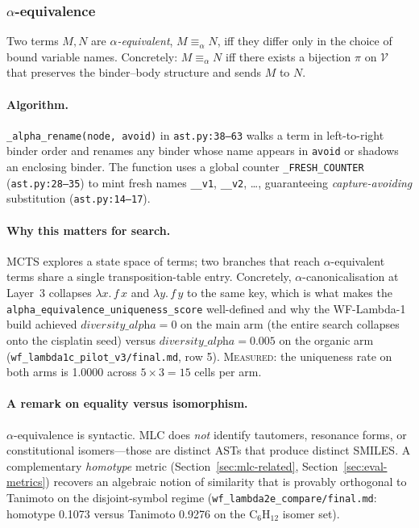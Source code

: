 \subsubsection{$\alpha$-equivalence}
\label{sec:mlc-alpha}

Two terms $M, N$ are \emph{$\alpha$-equivalent},
$M \equiv_{\alpha} N$, iff they differ only in the choice of bound
variable names. Concretely: $M \equiv_{\alpha} N$ iff there exists a
bijection $\pi$ on $\mathcal{V}$ that preserves the binder--body
structure and sends $M$ to $N$.

\paragraph{Algorithm.}
\texttt{\_alpha\_rename(node, avoid)} in
\texttt{ast.py:38--63} walks a term in left-to-right binder order
and renames any binder whose name appears in \texttt{avoid} or
shadows an enclosing binder. The function uses a global counter
\texttt{\_FRESH\_COUNTER} (\texttt{ast.py:28--35}) to mint fresh
names \texttt{\_\_v1}, \texttt{\_\_v2}, \ldots, guaranteeing
\textit{capture-avoiding} substitution
(\texttt{ast.py:14--17}).

\paragraph{Why this matters for search.}
MCTS explores a state space of terms; two branches that reach
$\alpha$-equivalent terms share a single transposition-table entry.
Concretely, $\alpha$-canonicalisation at Layer~3 collapses
$\lambda x.\, f\,x$ and $\lambda y.\, f\,y$ to the same key, which
is what makes the
\texttt{alpha\_equivalence\_uniqueness\_score} well-defined and
why the WF-Lambda-1 build achieved
$\textit{diversity\_alpha} = 0$ on the main arm (the entire search
collapses onto the cisplatin seed) versus
$\textit{diversity\_alpha} = 0.005$ on the organic arm
(\texttt{wf\_lambda1c\_pilot\_v3/final.md}, row 5).
\textsc{Measured}: the uniqueness rate on both arms is 1.0000
across $5 \times 3 = 15$ cells per arm.

\paragraph{A remark on equality versus isomorphism.}
$\alpha$-equivalence is syntactic. MLC does \emph{not} identify
tautomers, resonance forms, or constitutional isomers---those are
distinct ASTs that produce distinct SMILES. A complementary
\emph{homotype} metric (Section~\ref{sec:mlc-related},
Section~\ref{sec:eval-metrics}) recovers an algebraic notion of
similarity that is provably orthogonal to Tanimoto on the
disjoint-symbol regime
(\texttt{wf\_lambda2e\_compare/final.md}: homotype 0.1073 versus
Tanimoto 0.9276 on the C$_6$H$_{12}$ isomer set).

